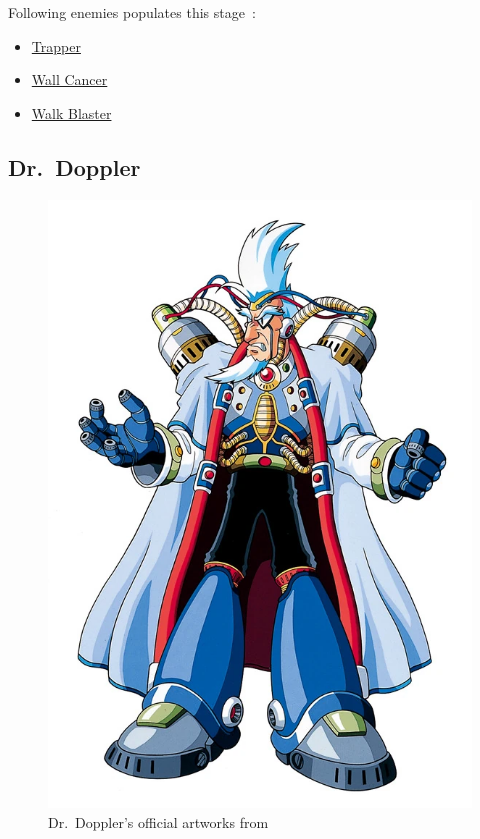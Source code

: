 Following enemies populates this stage~\cite{wiki:Doppler_stage}:
\begin{itemize}
	\item \hyperlink{enem:Trapper}{Trapper}
	\item \hyperlink{enem:Wall_Cancer}{Wall Cancer}
	\item \hyperlink{enem:Walk_Blaster}{Walk Blaster}
\end{itemize}

\subsection{Dr.~Doppler}\label{boss:Doppler} 
\begin{figure}[htp]
	\centering
	\includegraphics[height=\portraitsize]{figures/X3/Doppler_stages/drdoppler.png}
	\caption{Dr.~Doppler's official artworks from~\cite{book:MMX_Complete_art}}
\end{figure}

